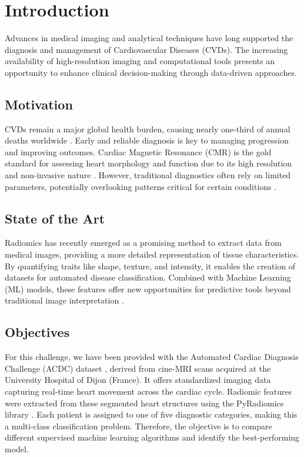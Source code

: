 \section{Introduction}

Advances in medical imaging and analytical techniques have long supported the
diagnosis and management of Cardiovascular Diseases (CVDs). The increasing
availability of high-resolution imaging and computational tools presents an
opportunity to enhance clinical decision-making through data-driven approaches.

\subsection{Motivation}

CVDs remain a major global health burden, causing nearly one-third of annual
deaths worldwide \cite{who2021cvd}. Early and reliable diagnosis is key to
managing progression and improving outcomes. Cardiac Magnetic Resonance (CMR)
is the gold standard for assessing heart morphology and function due to its
high resolution and non-invasive nature \cite{raisi2020cmr}. However,
traditional diagnostics often rely on limited parameters, potentially
overlooking patterns critical for certain conditions
\cite{lambin2017radiomics}.

\subsection{State of the Art}

Radiomics has recently emerged as a promising method to extract data from
medical images, providing a more detailed representation of tissue
characteristics. By quantifying traits like shape, texture, and intensity, it
enables the creation of datasets for automated disease classification. Combined
with Machine Learning (ML) models, these features offer new opportunities for
predictive tools beyond traditional image interpretation
\cite{gillies2016radiomics}.

\subsection{Objectives}

For this challenge, we have been provided with the Automated Cardiac Diagnosis
Challenge (ACDC) dataset \cite{bernard2018deep}, derived from cine-MRI scans
acquired at the University Hospital of Dijon (France). It offers standardized
imaging data capturing real-time heart movement across the cardiac cycle.
Radiomic features were extracted from these segmented heart structures using
the PyRadiomics library \cite{pyradiomics2024}. Each patient is assigned to one
of five diagnostic categories, making this a multi-class classification
problem. Therefore, the objective is to compare different supervised machine
learning algorithms and identify the best-performing model.


